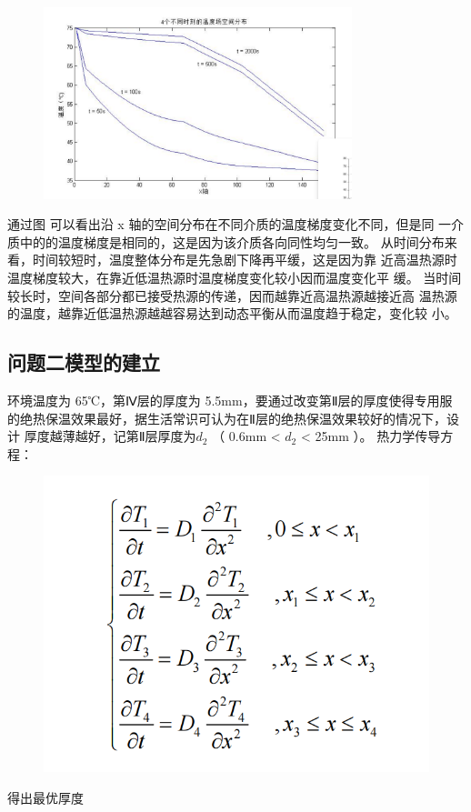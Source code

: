 \documentclass{article}
\begin{document}
	\begin{figure}[htbp]
		\centering
		\includegraphics[width=0.8\textwidth]{屏幕截图 2024-07-15 222951.png}
	\end{figure}
	
	通过图 可以看出沿 x 轴的空间分布在不同介质的温度梯度变化不同，但是同
	一介质中的的温度梯度是相同的，这是因为该介质各向同性均匀一致。 
	从时间分布来看，时间较短时，温度整体分布是先急剧下降再平缓，这是因为靠
	近高温热源时温度梯度较大，在靠近低温热源时温度梯度变化较小因而温度变化平
	缓。 
	当时间较长时，空间各部分都已接受热源的传递，因而越靠近高温热源越接近高
	温热源的温度，越靠近低温热源越越容易达到动态平衡从而温度趋于稳定，变化较
	小。
	\subsection{问题二模型的建立}
	环境温度为 65℃，第Ⅳ层的厚度为 5.5mm，要通过改变第Ⅱ层的厚度使得专用服
	的绝热保温效果最好，据生活常识可认为在Ⅱ层的绝热保温效果较好的情况下，设计
	厚度越薄越好，记第Ⅱ层厚度为$d_{2}$ （ 0.6mm < $d_{2}$ < 25mm ）。 
	热力学传导方程：
	
	\begin{figure}[htbp]
		\centering
		\includegraphics[scale=0.4]{屏幕截图 2024-07-15 222721.png}
	\end{figure}
	得出最优厚度
\end{document}
